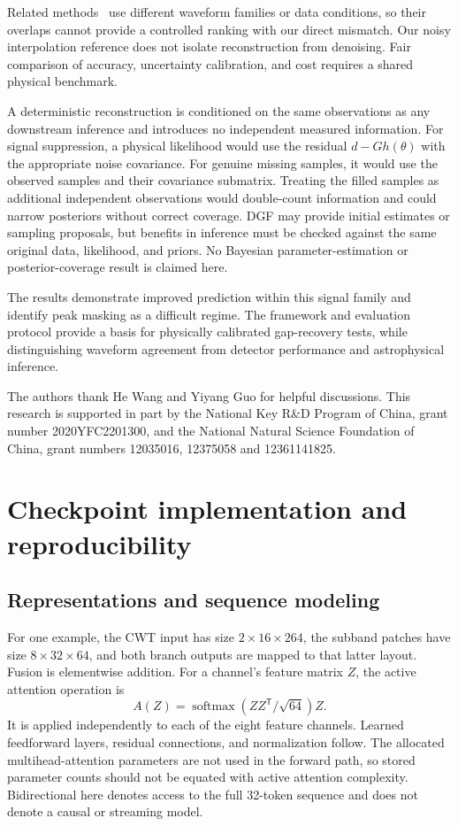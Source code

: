 \documentclass[10pt,prd,aps,a4paper,twocolumn,superscriptaddress,nofootinbib,floatfix]{revtex4-2}
\begin{document}
Related methods~\cite{Baghi2019,Blelly2021,Xu_2024,Mao:2025cae,Wang:2024waveformer} use different waveform families or data conditions, so their overlaps cannot provide a controlled ranking with our direct mismatch. Our noisy interpolation reference does not isolate reconstruction from denoising. Fair comparison of accuracy, uncertainty calibration, and cost requires a shared physical benchmark.

A deterministic reconstruction is conditioned on the same observations as any downstream inference and introduces no independent measured information. For signal suppression, a physical likelihood would use the residual $d-Gh(\theta)$ with the appropriate noise covariance. For genuine missing samples, it would use the observed samples and their covariance submatrix. Treating the filled samples as additional independent observations would double-count information and could narrow posteriors without correct coverage. DGF may provide initial estimates or sampling proposals, but benefits in inference must be checked against the same original data, likelihood, and priors. No Bayesian parameter-estimation or posterior-coverage result is claimed here.

The results demonstrate improved prediction within this signal family and identify peak masking as a difficult regime. The framework and evaluation protocol provide a basis for physically calibrated gap-recovery tests, while distinguishing waveform agreement from detector performance and astrophysical inference.
\begin{acknowledgments}
The authors thank He Wang and Yiyang Guo for helpful discussions. This research is supported in part by the National Key R\&D Program of China, grant number 2020YFC2201300, and the National Natural Science Foundation of China, grant numbers 12035016, 12375058 and 12361141825.



\end{acknowledgments}
\appendix
\section{Checkpoint implementation and reproducibility}\label{app:model_analysis}
\subsection{Representations and sequence modeling}
For one example, the CWT input has size $2\times16\times264$, the subband patches have size $8\times32\times64$, and both branch outputs are mapped to that latter layout. Fusion is elementwise addition. For a channel's feature matrix $Z$, the active attention operation is
\begin{equation}A(Z)=\operatorname{softmax}(ZZ^\mathsf T/\sqrt{64})Z.\end{equation}
It is applied independently to each of the eight feature channels. Learned feedforward layers, residual connections, and normalization follow. The allocated multihead-attention parameters are not used in the forward path, so stored parameter counts should not be equated with active attention complexity. Bidirectional here denotes access to the full 32-token sequence and does not denote a causal or streaming model.
\end{document}
